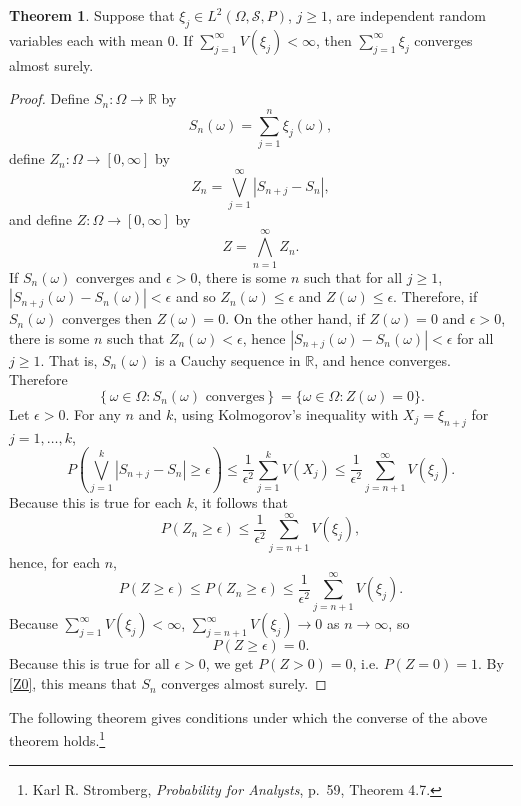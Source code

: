 \documentclass{article}
\theoremstyle{definition}
\newtheorem{theorem}{Theorem}
\theoremstyle{definition}
\begin{document}
\begin{theorem}
Suppose that $\xi_j \in L^2(\Omega,\mathscr{S},P)$, $j \geq 1$, are independent random variables
each with mean $0$. If $\sum_{j=1}^\infty V(\xi_j)<\infty$,
then $\sum_{j=1}^\infty \xi_j$ converges almost surely.
\end{theorem}
\begin{proof}
Define $S_n:\Omega \to \mathbb{R}$ by
\[
S_n(\omega)=\sum_{j=1}^n \xi_j(\omega),
\]
 define
$Z_n:\Omega \to [0,\infty]$ by
\[
Z_n = \bigvee_{j=1}^\infty |S_{n+j}-S_n|,
\]
and define $Z:\Omega \to  [0,\infty]$ by
\[
Z = \bigwedge_{n=1}^\infty Z_n.
\]
If $S_n(\omega)$ converges and $\epsilon>0$,
there is some $n$ such that for all $j \geq 1$,
$|S_{n+j}(\omega)-S_n(\omega)|<\epsilon$ and so
$Z_n(\omega) \leq \epsilon$ and 
$Z(\omega) \leq \epsilon$. Therefore, if
$S_n(\omega)$ converges then $Z(\omega)=0$. On the other hand,
if $Z(\omega)=0$ and $\epsilon>0$, there
is some $n$ such that
$Z_n(\omega)<\epsilon$, hence 
$|S_{n+j}(\omega)-S_n(\omega)| < \epsilon$ for all $j \geq 1$.
That is, $S_n(\omega)$ is a Cauchy sequence in $\mathbb{R}$,
and hence converges. Therefore
\begin{equation}
\left\{\omega \in \Omega: \textrm{$S_n(\omega)$ converges}\right\}=
\{\omega \in \Omega: Z(\omega)=0\}.
\label{Z0}
\end{equation}
Let $\epsilon>0$. For any $n$ and $k$, using Kolmogorov's inequality with
$X_j=\xi_{n+j}$ for $j=1,\ldots,k$,
\[
P\left( \bigvee_{j=1}^k |S_{n+j}-S_n| \geq \epsilon \right)
\leq \frac{1}{\epsilon^2} \sum_{j=1}^k V(X_j)
\leq \frac{1}{\epsilon^2} \sum_{j=n+1}^\infty V(\xi_j).
\]
Because this is true for each $k$, it follows that
\[
P(Z_n \geq \epsilon) \leq \frac{1}{\epsilon^2} \sum_{j=n+1}^\infty V(\xi_j),
\]
hence, for each $n$,
\[
P(Z \geq \epsilon) \leq P(Z_n \geq \epsilon) \leq \frac{1}{\epsilon^2} \sum_{j=n+1}^\infty V(\xi_j).
\]
Because $\sum_{j=1}^\infty V(\xi_j)<\infty$, $\sum_{j=n+1}^\infty V(\xi_j) \to 0$ as $n \to \infty$, so
\[
P(Z \geq \epsilon)=0.
\]
Because this is true for all $\epsilon>0$, we get $P(Z>0)=0$, i.e. $P(Z=0)=1$. By \eqref{Z0},
this means that $S_n$ converges almost surely.
\end{proof}


The following theorem gives conditions under which the converse of the above theorem
holds.\footnote{Karl R. Stromberg, {\em Probability for Analysts}, p.~59, Theorem 4.7.}
\end{document}

